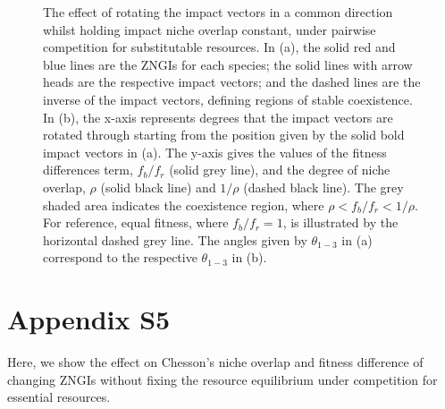 \newpage
\begin{figure}[H]
	\centering
	\caption[The effect of rotating the impact vectors in a common direction whilst holding impact niche overlap constant, under pairwise competition for substitutable resources.]
		{\hspace{1mm}The effect of rotating the impact vectors in a common direction whilst holding impact niche overlap constant, under pairwise competition for substitutable resources. In (a), the solid red and blue lines are the ZNGIs for each species; the solid lines with arrow heads are the respective impact vectors; and the dashed lines are the inverse of the impact vectors, defining regions of stable coexistence. In (b), the x-axis represents degrees that the impact vectors are rotated through starting from the position given by the solid bold impact vectors in (a). The y-axis gives the values of the fitness differences term, $f_{b}/f_{r}$ (solid grey line), and the degree of niche overlap, $\rho$ (solid black line) and $1/\rho$ (dashed black line). The grey shaded area indicates the coexistence region, where $\rho<f_{b}/f_{r}<1/\rho$. For reference, equal fitness, where $f_{b}/f_{r}=1$, is illustrated by the horizontal dashed grey line. The angles given by $\theta_{1-3}$ in (a) correspond to the respective $\theta_{1-3}$ in (b).}
	\label{fig:impact-appendix-fig-fix}
\end{figure}



\clearpage
\section{Appendix S5}
Here, we show the effect on Chesson's niche overlap and fitness difference of changing ZNGIs without fixing the resource equilibrium under competition for essential resources.
\par


